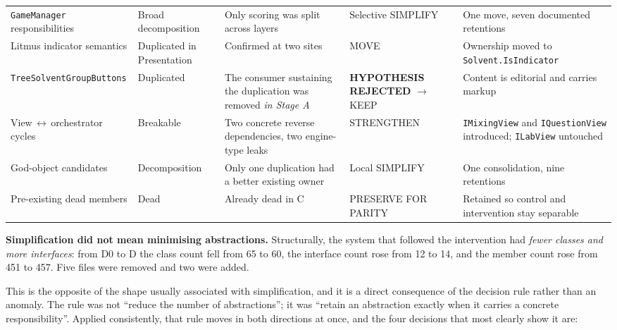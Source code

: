 \documentclass{sbc2019}%
\begin{document}
\begin{table}[!tp]
\begin{tabular}{p{}p{}p{}p{}p{}}
\addlinespace
\texttt{GameManager} responsibilities & Broad decomposition & Only scoring was split across layers & Selective SIMPLIFY & One move, seven documented retentions \\
\addlinespace
Litmus indicator semantics & Duplicated in Presentation & Confirmed at two sites & MOVE & Ownership moved to \texttt{Solvent.\allowbreak{}IsIndicator} \\
\addlinespace
\texttt{TreeSolvent\allowbreak{}GroupButtons} & Duplicated & The consumer sustaining the duplication was removed \emph{in Stage A} & \textbf{HYPOTHESIS REJECTED} $\rightarrow$ KEEP & Content is editorial and carries markup \\
\addlinespace
View\,$\leftrightarrow$\,orchestrator cycles & Breakable & Two concrete reverse dependencies, two engine-type leaks & STRENGTHEN & \texttt{IMixingView} and \texttt{IQuestionView} introduced; \texttt{ILabView} untouched \\
\addlinespace
God-object candidates & Decomposition & Only one duplication had a better existing owner & Local SIMPLIFY & One consolidation, nine retentions \\
\addlinespace
Pre-existing dead members & Dead & Already dead in C & PRESERVE FOR PARITY & Retained so control and intervention stay separable \\
\bottomrule
\end{tabular}
\end{table}

\medskip\noindent\textbf{Simplification did not mean minimising abstractions.}
Structurally, the system that followed the intervention had \emph{fewer classes
and more interfaces}: from D0 to D the class count fell from 65 to 60, the
interface count rose from 12 to 14, and the member count rose from 451 to 457. Five files
were removed and two were added.

This is the opposite of the shape usually associated with simplification, and it
is a direct consequence of the decision rule rather than an anomaly. The rule was
not ``reduce the number of abstractions''; it was ``retain an abstraction exactly
when it carries a concrete responsibility''. Applied consistently, that rule
moves in both directions at once, and the four decisions that most clearly show
it are:
\end{document}
